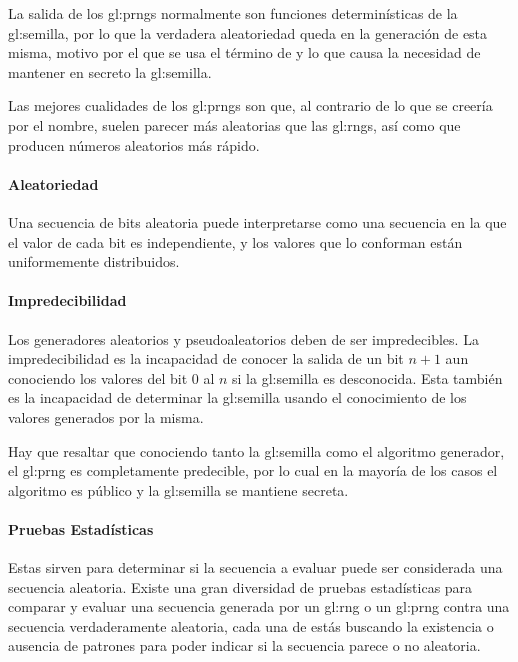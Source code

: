 La salida de los \gls{gl:prng}s normalmente son funciones determinísticas de 
la \gls{gl:semilla}, por lo que la verdadera aleatoriedad queda en la 
generación de esta misma, motivo por el que se usa el término de 
 y lo que causa la necesidad de mantener en secreto 
la \gls{gl:semilla}.

Las mejores cualidades de los \gls{gl:prng}s son que, al contrario de lo que 
se creería por el nombre, suelen parecer más aleatorias que las \gls{gl:rng}s, 
así como que producen números aleatorios más rápido.

\paragraph{Aleatoriedad} %

Una secuencia de bits aleatoria puede interpretarse como una secuencia en la 
que el valor de cada bit es independiente, y los valores que lo conforman 
están uniformemente distribuidos.

\paragraph{Impredecibilidad} %
\label{sec:impredecibilidad}

Los generadores aleatorios y pseudoaleatorios deben de ser impredecibles. 
La impredecibilidad es la incapacidad de conocer la salida de un bit $n+1$ 
aun conociendo los valores del bit $0$ al $n$ si la \gls{gl:semilla} es 
desconocida. Esta también es la incapacidad de determinar la \gls{gl:semilla} 
usando el conocimiento de los valores generados por la misma. 

Hay que resaltar que conociendo tanto la \gls{gl:semilla} como el algoritmo 
generador, el \gls{gl:prng} es completamente predecible, por lo cual en la 
mayoría de los casos el algoritmo es público y la \gls{gl:semilla} se mantiene 
secreta.

\paragraph{Pruebas Estadísticas} %

Estas sirven para determinar si la secuencia a evaluar puede ser considerada 
una secuencia aleatoria. Existe una gran diversidad de pruebas estadísticas 
para comparar y evaluar una secuencia generada por un \gls{gl:rng} o un 
\gls{gl:prng} contra una secuencia verdaderamente aleatoria, cada una de 
estás buscando la existencia o ausencia de patrones para poder indicar 
si la secuencia parece o no aleatoria.

